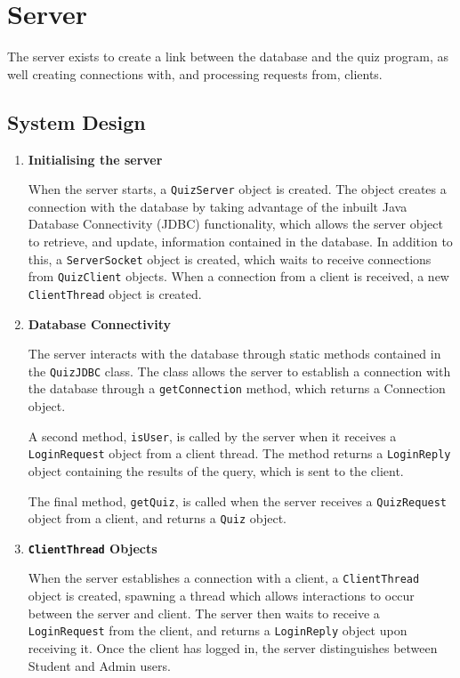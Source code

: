 \section{Server}
\label{sec:server}

The server exists to create a link between the database and the quiz program,
as well creating connections with, and processing requests from, clients.

\subsection{System Design}
\label{sub:system_design}

\begin{enumerate}
	\item \textbf{Initialising the server}

	When the server starts, a \texttt{QuizServer} object is created. The object
	creates a connection with the database by taking advantage of the inbuilt
	Java Database Connectivity (JDBC) functionality, which allows the server
	object to retrieve, and update, information contained in the database. In
	addition to this, a \texttt{ServerSocket} object is created, which waits to
	receive connections from \texttt{QuizClient} objects. When a connection
	from a client is received, a new \texttt{ClientThread} object is created.

	\item \textbf{Database Connectivity}

	The server interacts with the database through static methods contained in
	the \texttt{QuizJDBC} class. The class allows the server to establish a
	connection with the database through a \texttt{getConnection} method, which
	returns a Connection object.

	A second method, \texttt{isUser}, is called by the server when it receives
	a \texttt{LoginRequest} object from a client thread. The method returns a
	\texttt{LoginReply} object containing the results of the query, which is
	sent to the client.

	The final method, \texttt{getQuiz}, is called when the server receives a
	\texttt{QuizRequest} object from a client, and returns a \texttt{Quiz}
	object.

	\item \textbf{\texttt{ClientThread} Objects}

	When the server establishes a connection with a client, a
	\texttt{ClientThread} object is created, spawning a thread which allows
	interactions to occur between the server and client. The server then waits
	to receive a \texttt{LoginRequest} from the client, and returns a
	\texttt{LoginReply} object upon receiving it. Once the client has logged
	in, the server distinguishes between Student and Admin users.


\end{enumerate}
